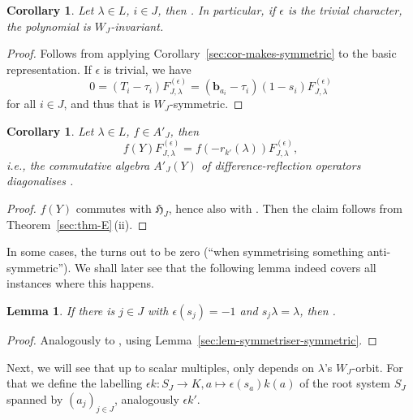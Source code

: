 \documentclass[pdftex]{sigma}
\newtheorem{Lemma}[Theorem]{Lemma}
\newtheorem{Corollary}[Theorem]{Corollary}
\theoremstyle{definition}
\numberwithin{equation}{section}
\begin{document}
\begin{Corollary}
 Let $\lambda\in L$, $i\in J$, then
.
 In particular, if $\epsilon$ is the trivial character, the polynomial
  is $W_J$-invariant.
\end{Corollary}
\begin{proof}
 Follows from applying Corollary~\ref{sec:cor-makes-symmetric} to
 the basic representation. If $\epsilon$ is trivial, we have%
 \[
 0 = (T_i-\tau_i)F^{(\epsilon)}_{J,\lambda}
 = (\bm{b}_{a_i} - \tau_i)(1-s_i)F^{(\epsilon)}_{J,\lambda}
 \]
 for all $i\in J$, and thus that  is $W_J$-symmetric.
\end{proof}

\begin{Corollary}
 Let $\lambda\in L$, $f\in A'_J$, then
 \[
 f(Y)F^{(\epsilon)}_{J,\lambda} = f(-r_{k'}(\lambda)) F^{(\epsilon)}_{J,\lambda},
 \]
 i.e., the commutative algebra $A'_J(Y)$ of difference-reflection operators
 diagonalises .
\end{Corollary}
\begin{proof}
 $f(Y)$ commutes with $\mathfrak{H}_J$, hence also with . Then the claim follows from Theo\-rem~\ref{sec:thm-E}\,(ii).
\end{proof}

In some cases, the  turns out to be zero
(``when symmetrising something anti-symmetric''). We shall later see
that the following lemma indeed covers all instances where this happens.

\begin{Lemma}\label{sec:lem-F-vanishes}
 If there is $j\in J$ with $\epsilon(s_j)=-1$ and $s_j\lambda=\lambda$, then
 .
\end{Lemma}
\begin{proof}
 Analogously to \cite[Section~5.7.1]{macdonald},
 using Lemma~\ref{sec:lem-symmetriser-symmetric}.
\end{proof}

Next, we will see that up to scalar multiples, 
only depends on
$\lambda$'s $W_J$-orbit. For that we define the labelling
$
 \epsilon k\colon S_J\to K, a\mapsto \epsilon(s_a)k(a)
$
of the root system $S_J$ spanned by $(a_j)_{j\in J}$, analogously $\epsilon k'$.
\end{document}
